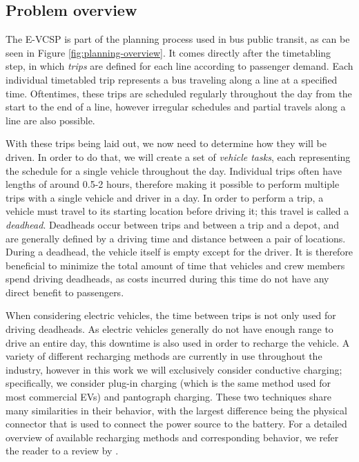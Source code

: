 \documentclass[]{article}
\begin{document}
\subsection{Problem overview}
The E-VCSP is part of the planning process used in bus public transit, as can be seen in Figure \ref{fig:planning-overview}. It comes directly after the timetabling step, in which \emph{trips} are defined for each line according to passenger demand. Each individual timetabled trip represents a bus traveling along a line at a specified time. Oftentimes, these trips are scheduled regularly throughout the day from the start to the end of a line, however irregular schedules and partial travels along a line are also possible.

With these trips being laid out, we now need to determine how they will be driven. In order to do that, we will create a set of \emph{vehicle tasks}, each representing the schedule for a single vehicle throughout the day. Individual trips often have lengths of around 0.5-2 hours, therefore making it possible to perform multiple trips with a single vehicle and driver in a day. In order to perform a trip, a vehicle must travel to its starting location before driving it; this travel is called a \emph{deadhead}. Deadheads occur between trips and between a trip and a depot, and are generally defined by a driving time and distance between a pair of locations. During a deadhead, the vehicle itself is empty except for the driver. It is therefore beneficial to minimize the total amount of time that vehicles and crew members spend driving deadheads, as costs incurred during this time do not have any direct benefit to passengers.

When considering electric vehicles, the time between trips is not only used for driving deadheads. As electric vehicles generally do not have enough range to drive an entire day, this downtime is also used in order to recharge the vehicle. A variety of different recharging methods are currently in use throughout the industry, however in this work we will exclusively consider conductive charging; specifically, we consider plug-in charging (which is the same method used for most commercial EVs) and pantograph charging. These two techniques share many similarities in their behavior, with the largest difference being the physical connector that is used to connect the power source to the battery. For a detailed overview of available recharging methods and corresponding behavior, we refer the reader to a review by \citet{Zhou2024}.
\end{document}
